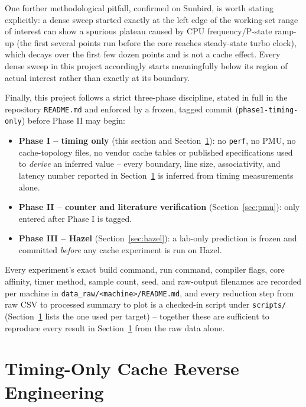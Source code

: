 \documentclass{article}
\begin{document}
One further methodological pitfall, confirmed on Sunbird, is worth stating explicitly: a
dense sweep started exactly at the left edge of the working-set range of interest can show
a spurious plateau caused by CPU frequency/P-state ramp-up (the first several points run
before the core reaches steady-state turbo clock), which decays over the first few dozen
points and is not a cache effect. Every dense sweep in this project accordingly starts
meaningfully below its region of actual interest rather than exactly at its boundary.

Finally, this project follows a strict three-phase discipline, stated in full in the
repository \texttt{README.md} and enforced by a frozen, tagged commit
(\texttt{phase1-timing-only}) before Phase II may begin:
\begin{itemize}
    \item \textbf{Phase I -- timing only} (this section and Section~\ref{sec:phase1}): no
    \texttt{perf}, no PMU, no cache-topology files, no vendor cache tables or published
    specifications used to \emph{derive} an inferred value -- every boundary, line size,
    associativity, and latency number reported in Section~\ref{sec:phase1} is inferred from
    timing measurements alone.
    \item \textbf{Phase II -- counter and literature verification} (Section~\ref{sec:pmu}):
    only entered after Phase I is tagged.
    \item \textbf{Phase III -- Hazel} (Section~\ref{sec:hazel}): a lab-only prediction is
    frozen and committed \emph{before} any cache experiment is run on Hazel.
\end{itemize}
Every experiment's exact build command, run command, compiler flags, core affinity, timer
method, sample count, seed, and raw-output filenames are recorded per machine in
\texttt{data\_raw/<machine>/README.md}, and every reduction step from raw CSV to processed
summary to plot is a checked-in script under \texttt{scripts/} (Section~\ref{sec:phase1}
lists the one used per target) -- together these are sufficient to reproduce every result
in Section~\ref{sec:phase1} from the raw data alone.

\section{Timing-Only Cache Reverse Engineering}
\label{sec:phase1}
\end{document}
